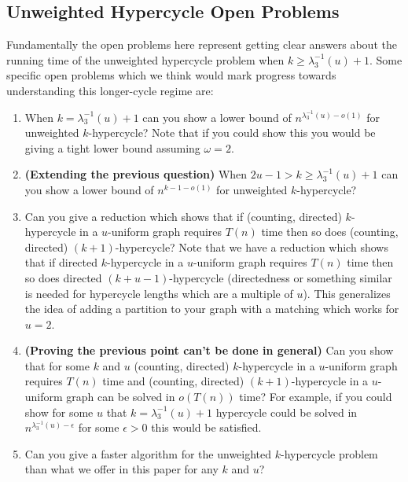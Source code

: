 \documentclass[11pt,letterpaper,pdftex]{article}
\begin{document}
\subsection{Unweighted Hypercycle Open Problems}
Fundamentally the open problems here represent getting clear answers about the running time of the unweighted hypercycle problem when $k\geq \lambda_3^{-1}(u)+1$. Some specific open problems which we think would mark progress towards understanding this longer-cycle regime are:
\begin{enumerate}
    \item When $k = \lambda_3^{-1}(u)+1$ can you show a lower bound of $n^{\lambda_3^{-1}(u)-o(1)}$ for unweighted $k$-hypercycle? Note that if you could show this you would be giving a tight lower bound assuming $\omega=2$. 
    \item \textbf{(Extending the previous question)} When $ 2u-1> k \geq \lambda_3^{-1}(u)+1$ can you show a lower bound of $n^{k-1-o(1)}$ for unweighted $k$-hypercycle? 
    \item Can you give a reduction which shows that if (counting, directed) $k$-hypercycle in a $u$-uniform graph requires $T(n)$ time then so does (counting, directed) $(k+1)$-hypercycle? Note that we have a reduction which shows that if directed $k$-hypercycle in a $u$-uniform graph requires $T(n)$ time then so does directed $(k+u-1)$-hypercycle (directedness or something similar is needed for hypercycle lengths which are a multiple of $u$). This generalizes the idea of adding a partition to your graph with a matching which works for $u=2$. 
    \item \textbf{(Proving the previous point can't be done in general)} Can you show that for some $k$ and $u$ (counting, directed) $k$-hypercycle in a $u$-uniform graph requires $T(n)$ time and (counting, directed) $(k+1)$-hypercycle in a $u$-uniform graph can be solved in $o(T(n))$ time? For example, if you could show for some $u$ that $k = \lambda_3^{-1}(u)+1$ hypercycle could be solved in $n^{\lambda_3^{-1}(u)-\epsilon}$ for some $\epsilon >0$ this would be satisfied.
    \item Can you give a faster algorithm for the unweighted $k$-hypercycle problem than what we offer in this paper for any $k$ and $u$? 
\end{enumerate}
\end{document}
